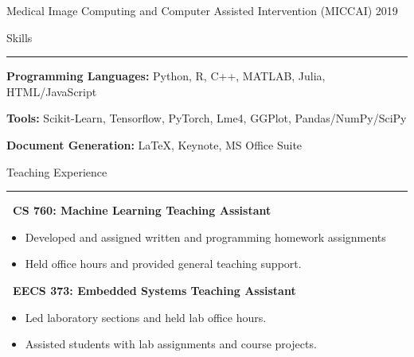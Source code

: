 \documentclass[]{article}
\begin{document}
\noindent Medical Image Computing and Computer Assisted Intervention (MICCAI) \hfill 2019

\iffalse
\noindent Medical Image Computing and Computer Assisted Intervention (MICCAI) \hfill 2018

\noindent (ad-hoc reviewer) International Conference in Machine Learning (ICML) \hfill 2018

\noindent (ad-hoc reviewer) Neural Information Processing Systems (NIPS) \hfill 2017
\fi

\vspace{20pt}
{\LARGE Skills}
\vspace{5pt}
\hrule
\vspace{10pt}

\noindent \textbf{Programming Languages:} Python, R, C++, MATLAB, Julia, HTML/JavaScript

\noindent \textbf{Tools:} Scikit-Learn, Tensorflow, PyTorch, Lme4, GGPlot, Pandas/NumPy/SciPy

\noindent \textbf{Document Generation:} \LaTeX, Keynote, MS Office Suite


\iffalse
\vspace{5pt}
{\LARGE Teaching Experience}
\vspace{3pt}
\hrule
\vspace{5pt}

 \newline
	{\bf \ CS 760: Machine Learning Teaching Assistant}
	\begin{itemize}[label={$\bullet$}]
		\item Developed and assigned written and programming homework assignments
		\item Held office hours and provided general teaching support.
	\end{itemize} 

 \newline
	{\bf \ EECS 373: Embedded Systems Teaching Assistant}
	\begin{itemize}[label={$\bullet$}]
		\item Led laboratory sections and held lab office hours.
		\item Assisted students with lab assignments and course projects.
	\end{itemize}
\end{document}
